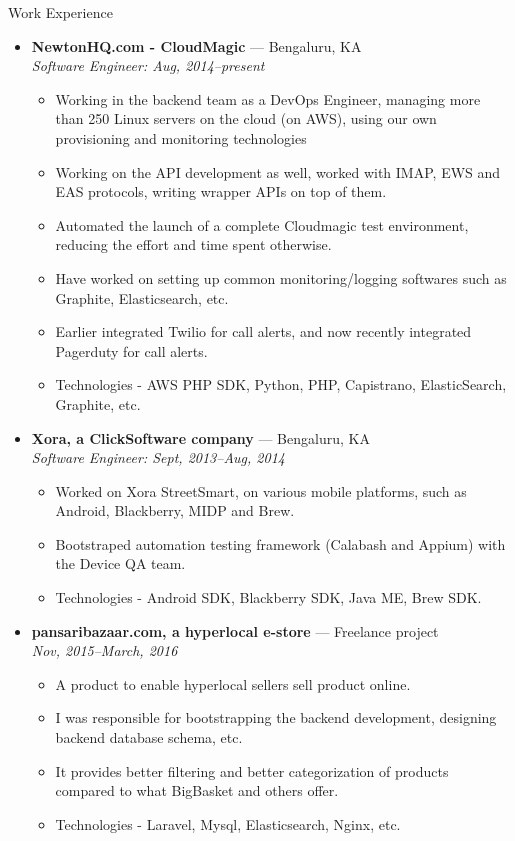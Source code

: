 \documentclass[a4paper,11pt,oneside]{article}
\newenvironment{ressection}[1]{
  \vspace{4pt}
         {\fontfamily{phv}\selectfont\Large#1}
         \begin{itemize}
           \vspace{3pt}
}{
         \end{itemize}
}
\newcommand{\ressubitem}[1]{
  \vspace{-1pt}
\item \begin{flushleft} #1 \end{flushleft}
}
\newcommand{\resbigitem}[3]{
  \vspace{-5pt}
\item
  \textbf{#1} --- #2 \\
  \textit{#3}
}
\newenvironment{ressubsec}[3]{
  \resbigitem{#1}{#2}{#3}
  \vspace{-2pt}
  \begin{itemize}
}{
  \end{itemize}
}
\begin{document}
\begin{ressection}{Work Experience}
  \begin{ressubsec}{NewtonHQ.com - CloudMagic}{Bengaluru, KA}{Software Engineer: Aug, 2014--present}
    \ressubitem{Working in the backend team as a DevOps Engineer, managing more than 250 Linux servers on the cloud (on AWS), using our own provisioning and monitoring technologies}
    \ressubitem{Working on the API development as well, worked with IMAP, EWS and EAS protocols, writing wrapper APIs on top of them.}
    \ressubitem{Automated the launch of a complete Cloudmagic test environment, reducing the effort and time spent otherwise.}
    \ressubitem{Have worked on setting up common monitoring/logging softwares such as Graphite, Elasticsearch, etc.}
    \ressubitem{Earlier integrated Twilio for call alerts, and now recently integrated Pagerduty for call alerts.}
    \ressubitem{Technologies - AWS PHP SDK, Python, PHP, Capistrano, ElasticSearch, Graphite, etc.}
  \end{ressubsec}
  \begin{ressubsec}{Xora, a ClickSoftware company}{Bengaluru, KA}{Software Engineer: Sept, 2013--Aug, 2014}
    \ressubitem{Worked on Xora StreetSmart, on various mobile platforms, such as Android, Blackberry, MIDP and Brew.}
    \ressubitem{Bootstraped automation testing framework (Calabash and Appium) with the Device QA team.}
    \ressubitem{Technologies - Android SDK, Blackberry SDK, Java ME, Brew SDK.}
  \end{ressubsec}
  \begin{ressubsec}{pansaribazaar.com, a hyperlocal e-store}{Freelance project}{Nov, 2015--March, 2016}
    \ressubitem{A product to enable hyperlocal sellers sell product online.}
    \ressubitem{I was responsible for bootstrapping the backend development, designing backend database schema, etc.}
    \ressubitem{It provides better filtering and better categorization of products compared to what BigBasket and others offer.}
    \ressubitem{Technologies - Laravel, Mysql, Elasticsearch, Nginx, etc.}
  \end{ressubsec}

\end{ressection}
\end{document}
